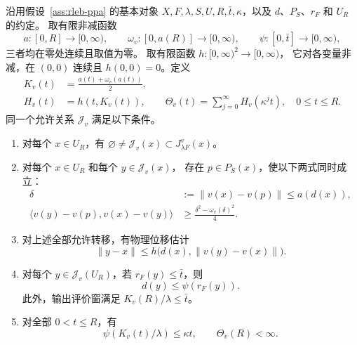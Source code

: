 \begin{assumption}
\label{ass:rleb-gppa-supplement}
沿用假设~\ref{ass:rleb-ppa} 的基本对象
$X,F,\lambda,S,U,R,\bar t,\kappa$，以及 $d$、$P_S$、$r_F$ 和 $U_R$ 的约定。
取有限非减函数
\[
 a:[0,R]\to[0,\infty),\qquad
 \omega_v:[0,a(R)]\to[0,\infty),\qquad
 \psi:[0,\bar t]\to[0,\infty),
\]
三者均在零处连续且取值为零。
取有限函数 $h:[0,\infty)^2\to[0,\infty)$，
它对各变量非减，在 $(0,0)$ 连续且 $h(0,0)=0$。定义
\begin{equation}
\label{eq:gppa-physical-moduli}
 \begin{aligned}
 K_v(t)&=\frac{a(t)+\omega_v(a(t))}{2},\\
 H_v(t)&=h(t,K_v(t)),\qquad
 \Theta_v(t)=\sum_{j=0}^{\infty}H_v(\kappa^jt),\quad 0\le t\le R.
 \end{aligned}
\end{equation}
同一个允许关系 $\mathcal J_v$ 满足以下条件。
\begin{enumerate}
\item[(G1)] 对每个 $x\in U_R$，有
$\varnothing\ne\mathcal J_v(x)\subset J^v_{\lambda F}(x)$。
\item[(G2)] 对每个 $x\in U_R$ 和每个 $y\in\mathcal J_v(x)$，
存在 $p\in P_S(x)$，使以下两式同时成立：
\begin{equation}
\label{eq:gppa-same-anchor}
 \begin{aligned}
 \delta&:=\|v(x)-v(p)\|\le a(d(x)),\\
 \langle v(y)-v(p),v(x)-v(y)\rangle
 &\ge\frac{\delta^2-\omega_v(\delta)^2}{4}.
 \end{aligned}
\end{equation}
\item[(G3)] 对上述全部允许转移，有物理位移估计
\begin{equation}
\label{eq:gppa-physical-transfer}
 \|y-x\|\le h\bigl(d(x),\|v(y)-v(x)\|\bigr).
\end{equation}
\item[(G4)] 对每个 $y\in\mathcal J_v(U_R)$，若 $r_F(y)\le\bar t$，则
\begin{equation}
\label{eq:gppa-true-output-EB}
 d(y)\le\psi(r_F(y)).
\end{equation}
此外，输出评价窗满足 $K_v(R)/\lambda\le\bar t$。
\item[(G5)] 对全部 $0<t\le R$，有
\begin{equation}
\label{eq:gppa-compatibility}
 \psi(K_v(t)/\lambda)\le\kappa t,
 \qquad \Theta_v(R)<\infty.
\end{equation}
\end{enumerate}
\end{assumption}

